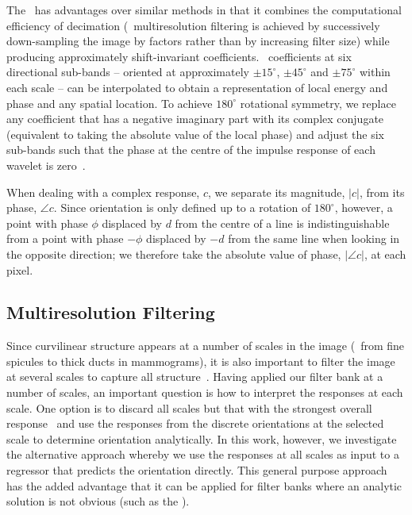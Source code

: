 The \dtcwt~has advantages over similar methods in that it combines the computational efficiency of decimation (\ie~multiresolution filtering is achieved by successively down-sampling the image by factors rather than by increasing filter size) while producing approximately shift-invariant coefficients. \dtcwt~coefficients at six directional sub-bands -- oriented at approximately $\pm15^\circ$, $\pm45^\circ$ and $\pm75^\circ$ within each scale -- can be interpolated to obtain a representation of local energy and phase and any spatial location. To achieve $180^\circ$ rotational symmetry, we replace any coefficient that has a negative imaginary part with its complex conjugate (equivalent to taking the absolute value of the local phase) and adjust the six sub-bands such that the phase at the centre of the impulse response of each wavelet is zero~\cite{Kingsbury_ECSP06,Berks_etal_IPMI11}.

When dealing with a complex response, $c$, we separate its magnitude, $|c|$, from its phase, $\angle c$. Since orientation is only defined up to a rotation of $180^\circ$, however, a point with phase $\phi$ displaced by $d$ from the centre of a line is indistinguishable from a point with phase $-\phi$ displaced by $-d$ from the same line when looking in the opposite direction; we therefore take the absolute value of phase, $|\angle c|$, at each pixel.


\subsection{Multiresolution Filtering}
Since curvilinear structure appears at a number of scales in the image (\eg~from fine spicules to thick ducts in mammograms), it is also important to filter the image at several scales to capture all structure~\cite{Lindeberg_IJCV98b}. Having applied our filter bank at a number of scales, an important question is how to interpret the responses at each scale. One option is to discard all scales but that with the strongest overall response~\cite{Karssemeijer_teBrake_TMI96} and use the responses from the discrete orientations at the selected scale to determine orientation analytically. In this work, however, we investigate the alternative approach whereby we use the responses at all scales as input to a regressor that predicts the orientation directly. This general purpose approach has the added advantage that it can be applied for filter banks where an analytic solution is not obvious (such as the \dtcwt).